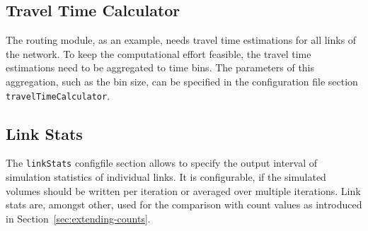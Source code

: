 \subsection{Travel Time Calculator}
\label{sec:ttc}
The routing module, as an example, needs travel time estimations for all links of the network. To keep the computational effort feasible, the travel time estimations need to be aggregated to time bins. The parameters of this aggregation, such as the bin size, can be specified in the configuration file section \lstinline|travelTimeCalculator|.

\subsection{Link Stats}
\label{sec:linkStats}
The \lstinline|linkStats| \gls{configfile} section allows to specify the output interval of simulation statistics of individual links. It is configurable, if the simulated volumes should be written per iteration or averaged over multiple iterations. Link stats are, amongst other, used for the comparison with count values as introduced in Section~\ref{sec:extending-counts}. 

